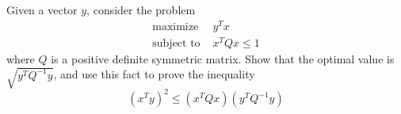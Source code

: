 \begin{proposition}
    Given a vector \(y\), consider the problem
    \begin{align*}
        \text{maximize } & y^Tx \\
        \text{subject to } & x^TQx\leq 1
    \end{align*}
    where \(Q\) is a positive definite symmetric matrix. Show that the optimal value is \(\sqrt{y^TQ^{-1}y}\), and use this fact to prove the inequality
    \[(x^Ty)^2 \leq (x^TQx)(y^TQ^{-1}y)\]
\end{proposition}